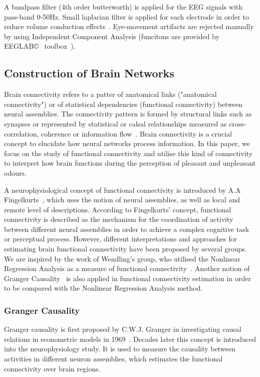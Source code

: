 \documentclass[conference]{IEEEtran}
\begin{document}
A bandpass filter (4th order butterworth) is applied for the EEG signals with pass-band 0-50Hz. Small laplacian filter is applied for each electrode in order to reduce volume conduction effects~\cite{wolters2007volume}. Eye-movement artifacts are rejected manually by using Independent Component Analysis (funcitons are provided by EEGLAB\copyright~ toolbox~\cite{luck2014introduction}). 

\subsection{Construction of Brain Networks}
Brain connectivity refers to a patter of anatomical links ("anatomical connectivity") or of statistical dependencies (functional connectivity) between neural assemblies. The connectivity pattern is formed by structural links such as synapses or represented by statistical or calsal relationships measured as cross-correlation, coherence or information flow~\cite{sporns2007brain}. Brain connectivity is a crucial concept to elucidate how neural networks process information. In this paper, we focus on the study of functional connectivity and utilise this kind of connectivity to interpret how brain functions during the perception of pleasant and unpleasant odours. 

A neurophysiological concept of functional connectivity is introduced by A.A Fingelkurts~\cite{fingelkurts2005functional}, which uses the notion of neural assemblies, as well as local and remote level of descriptions. According to Fingelkurts' concept, functional connectivity is described as the mechanism for the coordination of activity between different neural assemblies in order to achieve a complex cognitive task or perceptual process. However, different interpretations and approaches for estimating brain functional connectivity have been proposed by several groups. We are inspired by the work of Wendling's group, who utilised the Nonlinear Regression Analysis as a measure of functional connectivity~\cite{bettus2008enhanced}. Another notion of Granger Causality~\cite{roebroeck2005mapping} is also applied in functional connectivity estimation in order to be compared with the Nonlinear Regression Analysis method. 
\subsubsection{Granger Causality}
Granger causality is first proposed by C.W.J. Granger in investigating causal relations in econometric models in 1969~\cite{granger1969investigating}. Decades later this concept is introduced into the neurophysiology study. It is used to measure the causality between activities in different neuron assemblies, which estimates the functional connectivity over brain regions. 
\end{document}
